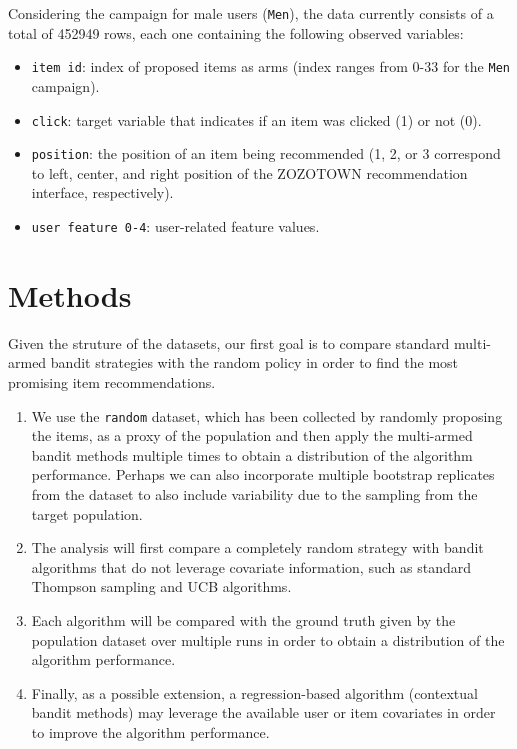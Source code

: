 \documentclass{article}
\begin{document}
Considering the campaign for male users (\texttt{Men}), the data currently consists of a total of 452949 rows, each one containing the following observed variables:
\begin{itemize}
    \item \texttt{item id}: index of proposed items as arms (index ranges from 0-33 for the \texttt{Men} campaign).
    \item \texttt{click}: target variable that indicates if an item was clicked (1) or not (0).
    \item \texttt{position}: the position of an item being recommended (1, 2, or 3 correspond to left, center, and right position of the ZOZOTOWN recommendation interface, respectively).
    \item  \texttt{user feature 0-4}: user-related feature values.
\end{itemize}



\section{Methods}
Given the struture of the datasets, our first goal is to compare standard multi-armed bandit strategies with the random policy in order to find the most promising item recommendations.
\begin{enumerate}
    \item We use the \texttt{random} dataset, which has been collected by randomly proposing the items, as a proxy of the population and then apply the multi-armed bandit methods multiple times to obtain a distribution of the algorithm performance.
    Perhaps we can also incorporate multiple bootstrap replicates from the dataset to also include variability due to the sampling from the target population.
    
    \item  The analysis will first compare a completely random strategy with bandit algorithms that do not leverage covariate information, such as standard Thompson sampling and UCB algorithms.
    
    \item Each algorithm will be compared with the ground truth given by the population dataset over multiple runs in order to obtain a distribution of the algorithm performance. 
    
    \item Finally, as a possible extension, a regression-based algorithm (contextual bandit methods) may leverage the available user or item covariates in order to improve the algorithm performance. 
\end{enumerate}
\end{document}
